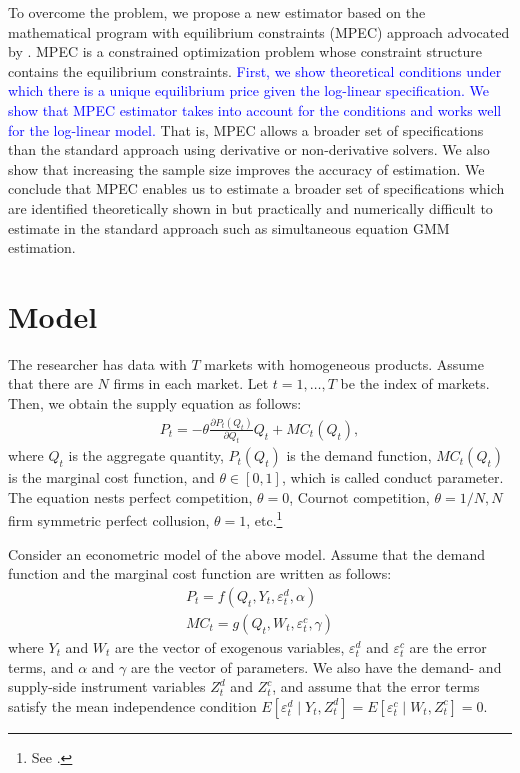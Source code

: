 \documentclass[11pt, a4paper]{article}
\begin{document}
To overcome the problem, we propose a new estimator based on the mathematical program with equilibrium constraints (MPEC) approach advocated by \cite{su2012constrained}. 
MPEC is a constrained optimization problem whose constraint structure contains the equilibrium constraints. 
\textcolor{blue}{First, we show theoretical conditions under which there is a unique equilibrium price given the log-linear specification.
We show that MPEC estimator takes into account for the conditions and works well for the log-linear model.} 
That is, MPEC allows a broader set of specifications than the standard approach using derivative or non-derivative solvers. 
We also show that increasing the sample size improves the accuracy of estimation.
We conclude that MPEC enables us to estimate a broader set of specifications which are identified theoretically shown in \cite{lau1982identifying} but practically and numerically difficult to estimate in the standard approach such as simultaneous equation GMM estimation.


\section{Model}
The researcher has data with $T$ markets with homogeneous products.
Assume that there are $N$ firms in each market.
Let $t = 1,\ldots, T$ be the index of markets.
Then, we obtain the supply equation as follows:
\begin{align}
     P_t = -\theta\frac{\partial P_t(Q_{t})}{\partial Q_{t}}Q_{t} + MC_t(Q_{t}),\label{eq:supply_equation}
\end{align}
where $Q_{t}$ is the aggregate quantity, $P_t(Q_{t})$ is the demand function, $MC_{t}(Q_{t})$ is the marginal cost function, and $\theta\in[0,1]$, which is called conduct parameter. 
The equation nests perfect competition, $\theta=0$, Cournot competition, $\theta=1/N, N$ firm symmetric perfect collusion, $\theta=1$, etc.\footnote{See \cite{bresnahan1982oligopoly}.} 

Consider an econometric model of the above model.
Assume that the demand function and the marginal cost function are written as follows: 
\begin{align}
    P_t = f(Q_{t}, Y_t, \varepsilon^{d}_{t}, \alpha) \label{eq:demand}\\
    MC_t = g(Q_{t}, W_{t}, \varepsilon^{c}_{t}, \gamma)\label{eq:marginal_cost}
\end{align}
where $Y_t$ and $W_{t}$ are the vector of exogenous variables, $\varepsilon^{d}_{t}$ and $\varepsilon^{c}_{t}$ are the error terms, and $\alpha$ and $\gamma$ are the vector of parameters.
We also have the demand- and supply-side instrument variables $Z^{d}_{t}$ and $Z^{c}_{t}$, and assume that the error terms satisfy the mean independence condition $E[\varepsilon^{d}_{t}\mid Y_t, Z^{d}_{t}] = E[\varepsilon^{c}_{t} \mid W_{t}, Z^{c}_{t}] =0$.
\end{document}
